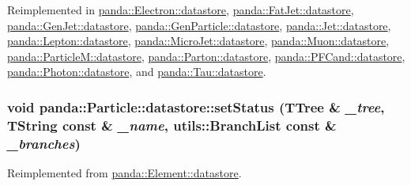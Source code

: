 Reimplemented in \hyperlink{structpanda_1_1Electron_1_1datastore_a71a4b440953afe1b0252d462753b74f1}{panda::Electron::datastore}, \hyperlink{structpanda_1_1FatJet_1_1datastore_a0064ba6151edcef6eb9d4c5b6a9fdcf7}{panda::FatJet::datastore}, \hyperlink{structpanda_1_1GenJet_1_1datastore_a7afa28bd4468d7ecb3c4c086d46ee6cf}{panda::GenJet::datastore}, \hyperlink{structpanda_1_1GenParticle_1_1datastore_ae55290c7499a0b5c80309462637d9e73}{panda::GenParticle::datastore}, \hyperlink{structpanda_1_1Jet_1_1datastore_aba38557e272994b9913ffbe323892d7d}{panda::Jet::datastore}, \hyperlink{structpanda_1_1Lepton_1_1datastore_a01bc67f154130787caab05786b3169c6}{panda::Lepton::datastore}, \hyperlink{structpanda_1_1MicroJet_1_1datastore_a475b19becb4a39eb0248e8b9c785feb3}{panda::MicroJet::datastore}, \hyperlink{structpanda_1_1Muon_1_1datastore_a04e66e2ffe68566cbba217d5682c8288}{panda::Muon::datastore}, \hyperlink{structpanda_1_1ParticleM_1_1datastore_ab9f9e7afb145c12941baa10892ed1811}{panda::ParticleM::datastore}, \hyperlink{structpanda_1_1Parton_1_1datastore_a2348c36dbc9d5f769fac19fcb9582e5a}{panda::Parton::datastore}, \hyperlink{structpanda_1_1PFCand_1_1datastore_a9f79eb8960ad6be9157ed49ec37f4258}{panda::PFCand::datastore}, \hyperlink{structpanda_1_1Photon_1_1datastore_a42cc43286a630dcffc73652309aa8990}{panda::Photon::datastore}, and \hyperlink{structpanda_1_1Tau_1_1datastore_a4cbb512cb1da538b968aa7bfea700f2b}{panda::Tau::datastore}.\hypertarget{structpanda_1_1Particle_1_1datastore_a82fcd5398687827418d8bdcbfc16d661}{
\subsubsection[{setStatus}]{\setlength{\rightskip}{0pt plus 5cm}void panda::Particle::datastore::setStatus (TTree \& {\em \_\-tree}, \/  TString const \& {\em \_\-name}, \/  {\bf utils::BranchList} const \& {\em \_\-branches})}}
\label{structpanda_1_1Particle_1_1datastore_a82fcd5398687827418d8bdcbfc16d661}


Reimplemented from \hyperlink{structpanda_1_1Element_1_1datastore_a8e57a201b92f26a481f2d549e39273e9}{panda::Element::datastore}.

